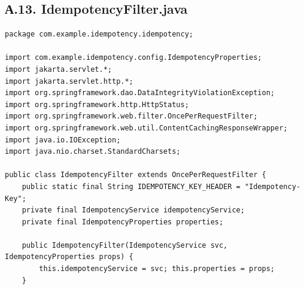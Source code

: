 \subsection*{А.13. IdempotencyFilter.java}
\begin{lstlisting}[caption={IdempotencyFilter.java --- HTTP-фильтр идемпотентности}]
package com.example.idempotency.idempotency;

import com.example.idempotency.config.IdempotencyProperties;
import jakarta.servlet.*;
import jakarta.servlet.http.*;
import org.springframework.dao.DataIntegrityViolationException;
import org.springframework.http.HttpStatus;
import org.springframework.web.filter.OncePerRequestFilter;
import org.springframework.web.util.ContentCachingResponseWrapper;
import java.io.IOException;
import java.nio.charset.StandardCharsets;

public class IdempotencyFilter extends OncePerRequestFilter {
    public static final String IDEMPOTENCY_KEY_HEADER = "Idempotency-Key";
    private final IdempotencyService idempotencyService;
    private final IdempotencyProperties properties;

    public IdempotencyFilter(IdempotencyService svc, IdempotencyProperties props) {
        this.idempotencyService = svc; this.properties = props;
    }


\end{lstlisting}
